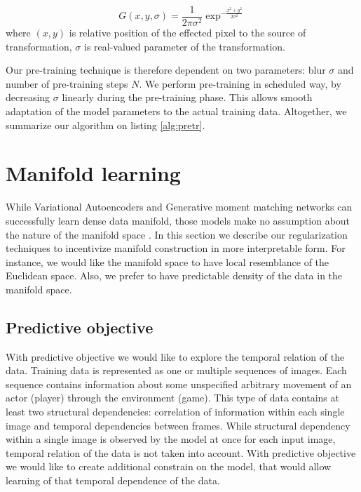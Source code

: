 \begin{equation}
  G(x, y, \sigma) = \frac{1}{2\pi\sigma^2}\exp^{-\frac{x^2+y^2}{2\sigma^2}}
\end{equation}
where $(x, y)$ is relative position of the effected pixel to the source of transformation, $\sigma$ is real-valued parameter of the transformation.

Our pre-training technique is therefore dependent on two parameters: blur $\sigma$ and number of pre-training steps $N$.
We perform pre-training in scheduled way, by decreasing $\sigma$ linearly during the pre-training phase.
This allows smooth adaptation of the model parameters to the actual training data.
Altogether, we summarize our algorithm on listing \ref{alg:pretr}.



\section{Manifold learning}\label{ss:mf}

While Variational Autoencoders and Generative moment matching networks can successfully learn dense data manifold, those models make no assumption about the nature of the manifold space \cite{Li2015, Ren2016, Kingma2013}.
In this section we describe our regularization techniques to incentivize manifold construction in more interpretable form.
For instance, we would like the manifold space to have local resemblance of the Euclidean space.
Also, we prefer to have predictable density of the data in the manifold space.

\subsection{Predictive objective}

With predictive objective we would like to explore the temporal relation of the data.
Training data is represented as one or multiple sequences of images.
Each sequence contains information about some unspecified arbitrary movement of an actor (player) through the environment (game).
This type of data contains at least two structural dependencies: correlation of information within each single image and temporal dependencies between frames.
While structural dependency within a single image is observed by the model at once for each input image, temporal relation of the data is not taken into account.
With predictive objective we would like to create additional constrain on the model, that would allow learning of that temporal dependence of the data.

